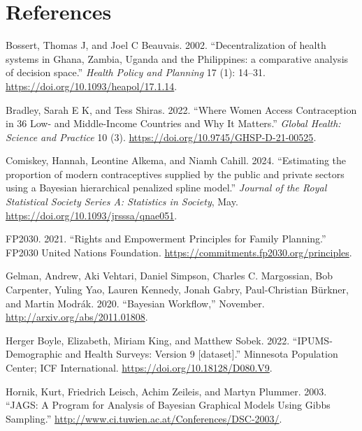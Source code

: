 \hypertarget{references}{%
\section*{References}\label{references}}

\hypertarget{refs}{}
\begin{CSLReferences}{1}{0}
\leavevmode{}%
Bossert, Thomas J, and Joel C Beauvais. 2002. {``{Decentralization of health systems in Ghana, Zambia, Uganda and the Philippines: a comparative analysis of decision space}.''} \emph{Health Policy and Planning} 17 (1): 14--31. \url{https://doi.org/10.1093/heapol/17.1.14}.

\leavevmode{}%
Bradley, Sarah E K, and Tess Shiras. 2022. {``{Where Women Access Contraception in 36 Low- and Middle-Income Countries and Why It Matters}.''} \emph{Global Health: Science and Practice} 10 (3). \url{https://doi.org/10.9745/GHSP-D-21-00525}.

\leavevmode{}%
Comiskey, Hannah, Leontine Alkema, and Niamh Cahill. 2024. {``{Estimating the proportion of modern contraceptives supplied by the public and private sectors using a Bayesian hierarchical penalized spline model}.''} \emph{Journal of the Royal Statistical Society Series A: Statistics in Society}, May. \url{https://doi.org/10.1093/jrsssa/qnae051}.

\leavevmode{}%
FP2030. 2021. {``{Rights and Empowerment Principles for Family Planning}.''} FP2030 \textbar{} United Nations Foundation. \url{https://commitments.fp2030.org/principles}.

\leavevmode{}%
Gelman, Andrew, Aki Vehtari, Daniel Simpson, Charles C. Margossian, Bob Carpenter, Yuling Yao, Lauren Kennedy, Jonah Gabry, Paul-Christian Bürkner, and Martin Modrák. 2020. {``Bayesian Workflow,''} November. \url{http://arxiv.org/abs/2011.01808}.

\leavevmode{}%
Herger Boyle, Elizabeth, Miriam King, and Matthew Sobek. 2022. {``{IPUMS-Demographic and Health Surveys: Version 9 {[}dataset{]}}.''} Minnesota Population Center; ICF International. \url{https://doi.org/10.18128/D080.V9}.

\leavevmode{}%
Hornik, Kurt, Friedrich Leisch, Achim Zeileis, and Martyn Plummer. 2003. {``{JAGS: A Program for Analysis of Bayesian Graphical Models Using Gibbs Sampling}.''} \url{http://www.ci.tuwien.ac.at/Conferences/DSC-2003/}.


\end{CSLReferences}
